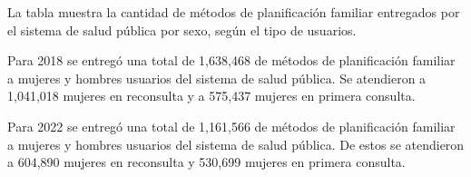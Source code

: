 La tabla muestra la cantidad de métodos de planificación familiar entregados por el sistema de salud pública por sexo, según el tipo de usuarios.

Para 2018 se entregó una total de 1,638,468 de métodos de planificación familiar a mujeres y hombres usuarios del sistema de salud pública. Se atendieron a 1,041,018 mujeres en reconsulta y a 575,437 mujeres en primera consulta. 

Para 2022 se entregó una total de 1,161,566 de métodos de planificación familiar a mujeres y hombres usuarios del sistema de salud pública. De estos se atendieron a 604,890 mujeres en reconsulta y 530,699 mujeres en primera consulta. 
